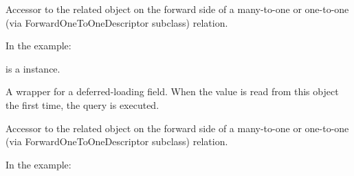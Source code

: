 \documentclass[letterpaper,10pt,english]{sphinxmanual}
\begin{document}
\begin{fulllineitems}
\begin{fulllineitems}
\label{\detokenize{QuChemPedIA.models:QuChemPedIA.models.ImportFileModels.ImportFile.id_software}}
Accessor to the related object on the forward side of a many-to-one or
one-to-one (via ForwardOneToOneDescriptor subclass) relation.

In the example:

%
\begin{sphinxVerbatim}[commandchars=\\\{\}]
 
       
\end{sphinxVerbatim}

 is a  instance.

\end{fulllineitems}


\begin{fulllineitems}
\label{\detokenize{QuChemPedIA.models:QuChemPedIA.models.ImportFileModels.ImportFile.id_software_id}}
A wrapper for a deferred-loading field. When the value is read from this
object the first time, the query is executed.

\end{fulllineitems}


\begin{fulllineitems}
\label{\detokenize{QuChemPedIA.models:QuChemPedIA.models.ImportFileModels.ImportFile.id_user}}
Accessor to the related object on the forward side of a many-to-one or
one-to-one (via ForwardOneToOneDescriptor subclass) relation.

In the example:

%
\begin{sphinxVerbatim}[commandchars=\\\{\}]
 
       
\end{sphinxVerbatim}


\end{fulllineitems}
\end{fulllineitems}
\end{document}

